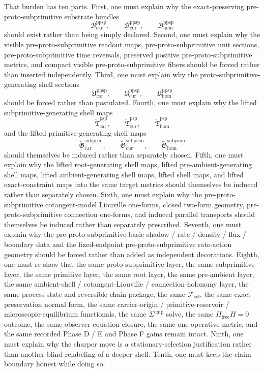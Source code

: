\documentclass[11pt]{article}
\newcommand{\StemFunctional}{\mathscr F_{\mathrm{sel}}}
\newcommand{\Car}{\mathrm{car}}
\newcommand{\Cur}{\mathrm{cur}}
\newcommand{\Hom}{\mathrm{hom}}
\newcommand{\PreProtoSubprimSpace}[1]{\mathcal B_{#1}^{\mathrm{ppsp}}}
\newcommand{\PreProtoSubprimSection}[1]{\mathfrak U_{#1}^{\mathrm{ppsp}}}
\newcommand{\PreProtoSubprimLiftedSubprimitive}[1]{\widetilde{\mathfrak T}_{#1}^{\mathrm{psp}}}
\newcommand{\PreProtoSubprimLiftedPrimitive}[1]{\widetilde{\mathfrak G}_{#1}^{\mathrm{subprim}}}
\begin{document}
That burden has ten parts. First, one must explain why the exact-preserving pre-proto-subprimitive substrate bundles
\[
\PreProtoSubprimSpace{\Car},\qquad
\PreProtoSubprimSpace{\Cur},\qquad
\PreProtoSubprimSpace{\Hom}
\]
should exist rather than being simply declared. Second, one must explain why the visible pre-proto-subprimitive readout maps, pre-proto-subprimitive unit sections, pre-proto-subprimitive time reversals, preserved positive pre-proto-subprimitive metrics, and compact visible pre-proto-subprimitive fibers should be forced rather than inserted independently. Third, one must explain why the proto-subprimitive-generating shell sections
\[
\PreProtoSubprimSection{\Car},\qquad
\PreProtoSubprimSection{\Cur},\qquad
\PreProtoSubprimSection{\Hom}
\]
should be forced rather than postulated. Fourth, one must explain why the lifted subprimitive-generating shell maps
\[
\PreProtoSubprimLiftedSubprimitive{\Car},\qquad
\PreProtoSubprimLiftedSubprimitive{\Cur},\qquad
\PreProtoSubprimLiftedSubprimitive{\Hom}
\]
and the lifted primitive-generating shell maps
\[
\PreProtoSubprimLiftedPrimitive{\Car},\qquad
\PreProtoSubprimLiftedPrimitive{\Cur},\qquad
\PreProtoSubprimLiftedPrimitive{\Hom}
\]
should themselves be induced rather than separately chosen. Fifth, one must explain why the lifted root-generating shell maps, lifted pre-ambient-generating shell maps, lifted ambient-generating shell maps, lifted shell maps, and lifted exact-constraint maps into the same target metrics should themselves be induced rather than separately chosen. Sixth, one must explain why the pre-proto-subprimitive cotangent-model Liouville one-forms, closed two-form geometry, pre-proto-subprimitive connection one-forms, and induced parallel transports should themselves be induced rather than separately prescribed. Seventh, one must explain why the pre-proto-subprimitive-basic shadow / rate / density / flux / boundary data and the fixed-endpoint pre-proto-subprimitive rate-action geometry should be forced rather than added as independent decorations. Eighth, one must re-show that the same proto-subprimitive layer, the same subprimitive layer, the same primitive layer, the same root layer, the same pre-ambient layer, the same ambient-shell / cotangent-Liouville / connection-holonomy layer, the same process-state and reversible-chain package, the same \(\StemFunctional\), the same exact-preservation normal form, the same carrier-origin / primitive-reservoir / microscopic-equilibrium functionals, the same \(\Sigma^{\mathrm{cmp}}\) solve, the same \(\Pi_{\mathrm{free}}H=0\) outcome, the same observer-equation closure, the same one operative metric, and the same recorded Phase D / E and Phase F gains remain intact. Ninth, one must explain why the sharper move is a stationary-selection justification rather than another blind relabeling of a deeper shell. Tenth, one must keep the claim boundary honest while doing so.
\end{document}
